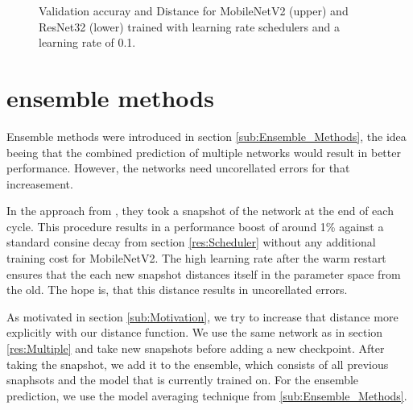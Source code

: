 \begin{figure}[h]
\begin{center}
        \caption{Validation accuray and Distance for MobileNetV2 (upper) and ResNet32 (lower) trained with learning rate schedulers and a learning rate of 0.1.}
    \end{center}
\end{figure}



\section{ensemble methods}\label{res:Ensemble}
Ensemble methods were introduced in section \ref{sub:Ensemble_Methods}, the idea
beeing that the combined prediction of multiple networks would result in better
performance. However, the networks need uncorellated errors for that
increasement.

In the approach from \cite{loshchilov2016sgdr}, they took a snapshot of the
network at the end of each cycle. This procedure results in a performance boost
of around 1\% against a standard consine decay from section \ref{res:Scheduler}
without any additional training cost for MobileNetV2. The high learning rate after the warm
restart ensures that the each new snapshot distances itself in the parameter
space from the old. The hope is, that this distance results in uncorellated
errors.

As motivated in section \ref{sub:Motivation}, we try to increase that distance
more explicitly with our distance function. We use the same network as in
section \ref{res:Multiple} and take new snapshots before adding a new
checkpoint. After taking the snapshot, we add it to the ensemble, which consists
of all previous snaphsots and the model that is currently trained on. For the
ensemble prediction, we use the model averaging technique from
\ref{sub:Ensemble_Methods}.


